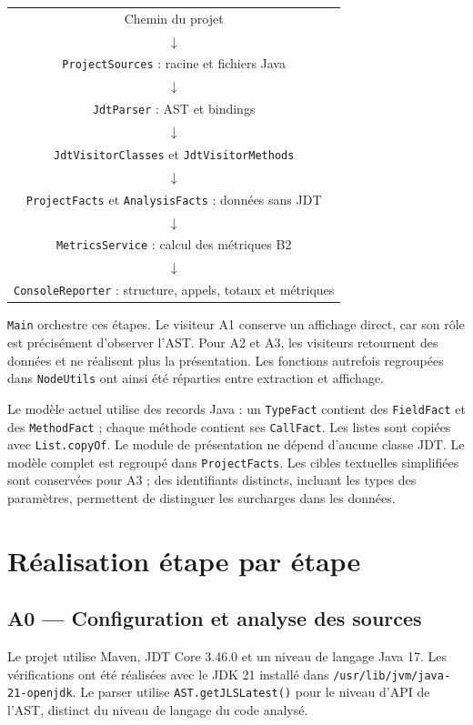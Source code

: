 \documentclass[11pt,a4paper]{article}
\newcommand{\code}[1]{\texttt{#1}}
\begin{document}
\begin{center}
\begin{tabular}{c}
Chemin du projet\\$\downarrow$\\
\code{ProjectSources} : racine et fichiers Java\\$\downarrow$\\
\code{JdtParser} : AST et bindings\\$\downarrow$\\
\code{JdtVisitorClasses} et \code{JdtVisitorMethods}\\$\downarrow$\\
\code{ProjectFacts} et \code{AnalysisFacts} : données sans JDT\\$\downarrow$\\
\code{MetricsService} : calcul des métriques B2\\$\downarrow$\\
\code{ConsoleReporter} : structure, appels, totaux et métriques
\end{tabular}
\end{center}

\code{Main} orchestre ces étapes. Le visiteur A1 conserve un affichage direct, car son rôle est précisément d'observer l'AST. Pour A2 et A3, les visiteurs retournent des données et ne réalisent plus la présentation. Les fonctions autrefois regroupées dans \code{NodeUtils} ont ainsi été réparties entre extraction et affichage.

Le modèle actuel utilise des records Java : un \code{TypeFact} contient des \code{FieldFact} et des \code{MethodFact} ; chaque méthode contient ses \code{CallFact}. Les listes sont copiées avec \code{List.copyOf}. Le module de présentation ne dépend d'aucune classe JDT. Le modèle complet est regroupé dans \code{ProjectFacts}. Les cibles textuelles simplifiées sont conservées pour A3 ; des identifiants distincts, incluant les types des paramètres, permettent de distinguer les surcharges dans les données.

\section{Réalisation étape par étape}
\subsection{A0 --- Configuration et analyse des sources}
Le projet utilise Maven, JDT Core 3.46.0 et un niveau de langage Java 17. Les vérifications ont été réalisées avec le JDK 21 installé dans \code{/usr/lib/jvm/java-21-openjdk}. Le parser utilise \code{AST.getJLSLatest()} pour le niveau d'API de l'AST, distinct du niveau de langage du code analysé.
\end{document}
